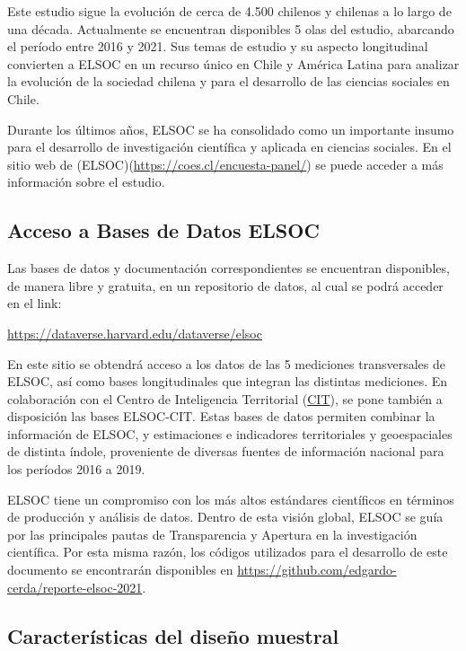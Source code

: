 \documentclass[
  12pt,
]{book}
\begin{document}
Este estudio sigue la evolución de cerca de 4.500 chilenos y chilenas a lo largo de una década. Actualmente se encuentran disponibles 5 olas del estudio, abarcando el período entre 2016 y 2021. Sus temas de estudio y su aspecto longitudinal convierten a ELSOC en un recurso único en Chile y América Latina para analizar la evolución de la sociedad chilena y para el desarrollo de las ciencias sociales en Chile.

Durante los últimos años, ELSOC se ha consolidado como un importante insumo para el desarrollo de investigación científica y aplicada en ciencias sociales. En el sitio web de (ELSOC)(\url{https://coes.cl/encuesta-panel/}) se puede acceder a más información sobre el estudio.

\hypertarget{acceso-a-bases-de-datos-elsoc}{%
\subsection*{Acceso a Bases de Datos ELSOC}\label{acceso-a-bases-de-datos-elsoc}}

Las bases de datos y documentación correspondientes se encuentran disponibles, de manera libre y gratuita, en un repositorio de datos, al cual se podrá acceder en el link:

\url{https://dataverse.harvard.edu/dataverse/elsoc}

En este sitio se obtendrá acceso a los datos de las 5 mediciones transversales de ELSOC, así como bases longitudinales que integran las distintas mediciones. En colaboración con el Centro de Inteligencia Territorial (\href{https://cit.uai.cl/}{CIT}), se pone también a disposición las bases ELSOC-CIT. Estas bases de datos permiten combinar la información de ELSOC, y estimaciones e indicadores territoriales y geoespaciales de distinta índole, proveniente de diversas fuentes de información nacional para los períodos 2016 a 2019.

ELSOC tiene un compromiso con los más altos estándares científicos en términos de producción y análisis de datos. Dentro de esta visión global, ELSOC se guía por las principales pautas de Transparencia y Apertura en la investigación científica. Por esta misma razón, los códigos utilizados para el desarrollo de este documento se encontrarán disponibles en \url{https://github.com/edgardo-cerda/reporte-elsoc-2021}.

\hypertarget{caracteruxedsticas-del-diseuxf1o-muestral}{%
\subsection*{Características del diseño muestral}\label{caracteruxedsticas-del-diseuxf1o-muestral}}
\end{document}
